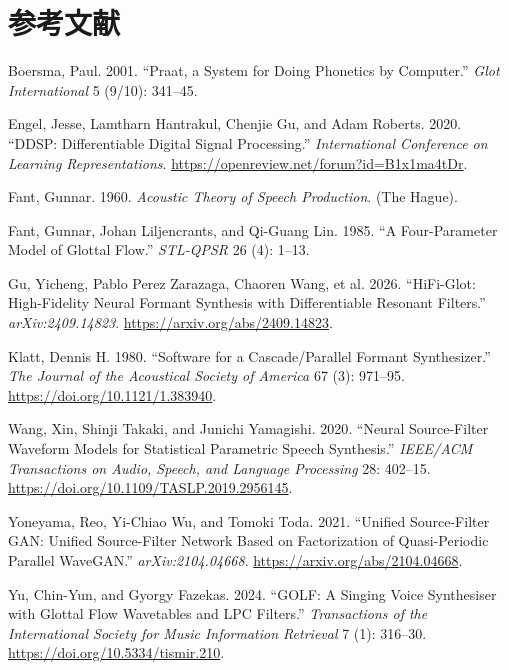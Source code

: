 \section*{参考文献}\label{ux53c2ux8003ux6587ux732e}

\protect{}\label{refs}
\begin{CSLReferences}{1}{1}
Boersma, Paul. 2001. {``Praat, a System for Doing Phonetics by
Computer.''} \emph{Glot International} 5 (9/10): 341--45.

Engel, Jesse, Lamtharn Hantrakul, Chenjie Gu, and Adam Roberts. 2020.
{``DDSP: Differentiable Digital Signal Processing.''}
\emph{International Conference on Learning Representations}.
\url{https://openreview.net/forum?id=B1x1ma4tDr}.

Fant, Gunnar. 1960. \emph{Acoustic Theory of Speech Production}. (The
Hague).

Fant, Gunnar, Johan Liljencrants, and Qi-Guang Lin. 1985. {``A
Four-Parameter Model of Glottal Flow.''} \emph{STL-QPSR} 26 (4): 1--13.

Gu, Yicheng, Pablo Perez Zarazaga, Chaoren Wang, et al. 2026.
{``HiFi-Glot: High-Fidelity Neural Formant Synthesis with Differentiable
Resonant Filters.''} \emph{arXiv:2409.14823}.
\url{https://arxiv.org/abs/2409.14823}.

Klatt, Dennis H. 1980. {``Software for a Cascade/Parallel Formant
Synthesizer.''} \emph{The Journal of the Acoustical Society of America}
67 (3): 971--95. \url{https://doi.org/10.1121/1.383940}.

Wang, Xin, Shinji Takaki, and Junichi Yamagishi. 2020. {``Neural
Source-Filter Waveform Models for Statistical Parametric Speech
Synthesis.''} \emph{IEEE/ACM Transactions on Audio, Speech, and Language
Processing} 28: 402--15.
\url{https://doi.org/10.1109/TASLP.2019.2956145}.

Yoneyama, Reo, Yi-Chiao Wu, and Tomoki Toda. 2021. {``Unified
Source-Filter GAN: Unified Source-Filter Network Based on Factorization
of Quasi-Periodic Parallel WaveGAN.''} \emph{arXiv:2104.04668}.
\url{https://arxiv.org/abs/2104.04668}.

Yu, Chin-Yun, and Gyorgy Fazekas. 2024. {``GOLF: A Singing Voice
Synthesiser with Glottal Flow Wavetables and LPC Filters.''}
\emph{Transactions of the International Society for Music Information
Retrieval} 7 (1): 316--30. \url{https://doi.org/10.5334/tismir.210}.

\end{CSLReferences}
